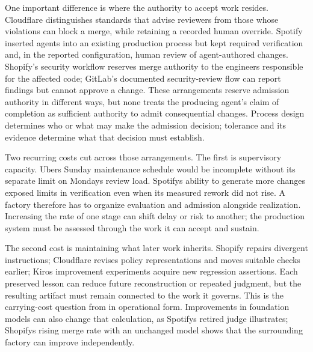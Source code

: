 One important difference is where the authority to accept work resides. Cloudflare distinguishes standards that advise reviewers from those whose violations can block a merge, while retaining a recorded human override\citep{skidmore2026review}. Spotify inserted agents into an existing production process but kept required verification and, in the reported configuration, human review of agent-authored changes\citep{charas2025honk,curtis2026spotifyqcon}. Shopify's security workflow reserves merge authority to the engineers responsible for the affected code\citep{son2026security}; GitLab's documented security-review flow can report findings but cannot approve a change\citep{gitlab2026securityreview}. These arrangements reserve admission authority in different ways, but none treats the producing agent's claim of completion as sufficient authority to admit consequential changes. Process design determines who or what may make the admission decision; tolerance and its evidence determine what that decision must establish.


Two recurring costs cut across those arrangements. The first is supervisory capacity. Uber\textquotesingle s Sunday maintenance schedule would be incomplete without its separate limit on Monday\textquotesingle s review load. Spotify\textquotesingle s ability to generate more changes exposed limits in verification even when its measured rework did not rise. A factory therefore has to organize evaluation and admission alongside realization. Increasing the rate of one stage can shift delay or risk to another; the production system must be assessed through the work it can accept and sustain.


The second cost is maintaining what later work inherits. Shopify repairs divergent instructions; Cloudflare revises policy representations and moves suitable checks earlier; Kiro\textquotesingle s improvement experiments acquire new regression assertions. Each preserved lesson can reduce future reconstruction or repeated judgment, but the resulting artifact must remain connected to the work it governs. This is the carrying-cost question from  in operational form. Improvements in foundation models can also change that calculation, as Spotify\textquotesingle s retired judge illustrates; Shopify\textquotesingle s rising merge rate with an unchanged model shows that the surrounding factory can improve independently.
